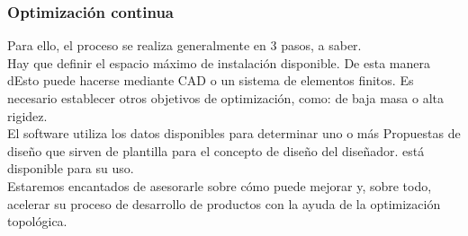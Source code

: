 \documentclass{article}
\begin{document}
\subsubsection{Optimización continua}
Para ello, el proceso se realiza generalmente en 3 pasos, a saber.\\
Hay que definir el espacio máximo de instalación disponible. De esta manera dEsto puede hacerse mediante CAD o un sistema de elementos finitos.
Es necesario establecer otros objetivos de optimización, como: de baja masa o alta rigidez.\\
El software utiliza los datos disponibles para determinar uno o más Propuestas de diseño que sirven de plantilla para el concepto de diseño del diseñador. está disponible para su uso.\\
Estaremos encantados de asesorarle sobre cómo puede mejorar y, sobre todo, acelerar su proceso de desarrollo de productos con la ayuda de la optimización topológica.
\newpage
\end{document}
